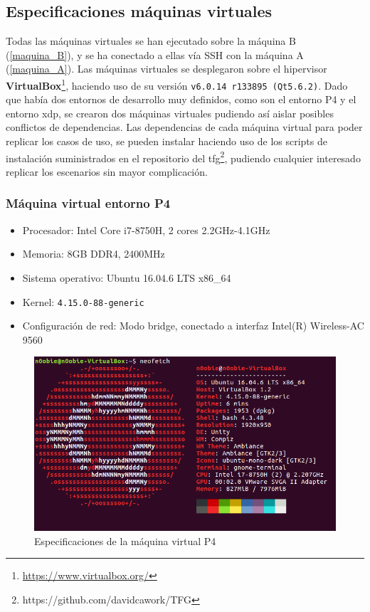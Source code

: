 \subsection{Especificaciones máquinas virtuales}
Todas las máquinas virtuales se han ejecutado sobre la máquina B (\ref{maquina_B}), y se ha conectado a ellas vía SSH con la máquina A (\ref{maquina_A}). Las máquinas virtuales se desplegaron sobre el hipervisor \textbf{VirtualBox}\footnote{\url{https://www.virtualbox.org/}}, haciendo uso de su versión \texttt{v6.0.14 r133895 (Qt5.6.2)}. Dado que había dos entornos de desarrollo muy definidos, como son el entorno P4 y el entorno \gls{xdp}, se crearon dos máquinas virtuales pudiendo así aislar posibles conflictos de dependencias. Las dependencias de cada máquina virtual para poder replicar los casos de uso, se pueden instalar haciendo uso de los scripts de instalación suministrados en el repositorio del \gls{tfg}\footnote{https://github.com/davidcawork/TFG}, pudiendo cualquier interesado replicar los escenarios sin mayor complicación. \\

\par

\subsubsection{Máquina virtual entorno P4}
\vspace{0.5cm}
\label{maquina_p4}
    \begin{itemize}
        \item Procesador: Intel Core i7-8750H, 2 cores 2.2GHz-4.1GHz
        \item Memoria: 8GB DDR4, 2400MHz
        \item Sistema operativo: Ubuntu 16.04.6 LTS x86\_64
        \item Kernel: \texttt{4.15.0-88-generic}
        \item Configuración de red: Modo bridge, conectado a interfaz Intel(R) Wireless-AC 9560
    \end{itemize}
    \vspace{1cm}
    \begin{figure}[ht]
        \centering
        \includegraphics[width=12cm]{archivos/img/anexos/VM_p4_edited.png}
        \caption{Especificaciones de la máquina virtual P4}
        \label{fig:VM_p4}
    \end{figure}
\newpage    
